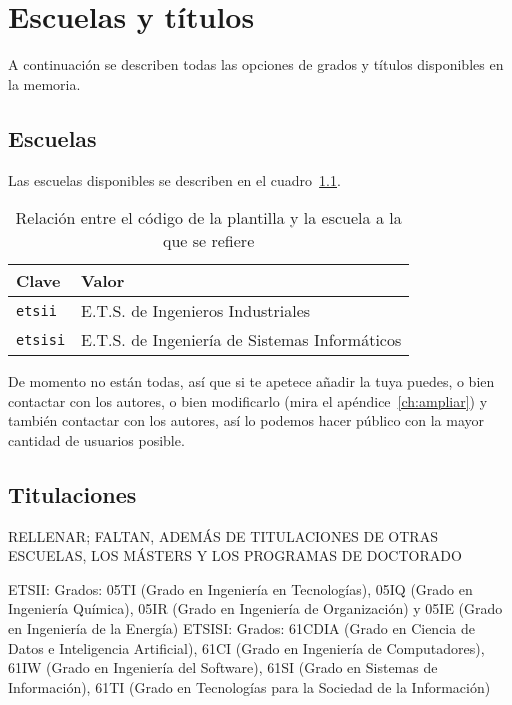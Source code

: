 \chapter{Escuelas y títulos}
\label{ch:escuelas-y-titulos}

A continuación se describen todas las opciones de grados y títulos disponibles en la memoria.

\section{Escuelas}

Las escuelas disponibles se describen en el cuadro~\ref{tbl:schools}.

\begin{table}[h]
    \centering
    \begin{tabular}{@{}ll@{}}
        \toprule
        \textbf{Clave}  & \textbf{Valor} \\
        \midrule
        \texttt{etsii}  & E.T.S. de Ingenieros Industriales \\
        \texttt{etsisi} & E.T.S. de Ingeniería de Sistemas Informáticos \\
        \bottomrule
    \end{tabular}
    \caption{\label{tbl:schools} Relación entre el código de la plantilla y la escuela a la que se refiere}
\end{table}

De momento no están todas, así que si te apetece añadir la tuya puedes, o bien contactar con los autores, o bien modificarlo (mira el apéndice~\ref{ch:ampliar}) y también contactar con los autores, así lo podemos hacer público con la mayor cantidad de usuarios posible.

\section{Titulaciones}

RELLENAR; FALTAN, ADEMÁS DE TITULACIONES DE OTRAS ESCUELAS, LOS MÁSTERS Y LOS PROGRAMAS DE DOCTORADO

ETSII: Grados: 05TI (Grado en Ingeniería en Tecnologías), 05IQ (Grado en Ingeniería Química), 05IR (Grado en Ingeniería de Organización) y 05IE (Grado en Ingeniería de la Energía)
ETSISI: Grados: 61CDIA (Grado en Ciencia de Datos e Inteligencia Artificial), 61CI (Grado en Ingeniería de Computadores), 61IW (Grado en Ingeniería del Software), 61SI (Grado en Sistemas de Información), 61TI (Grado en Tecnologías para la Sociedad de la Información)
